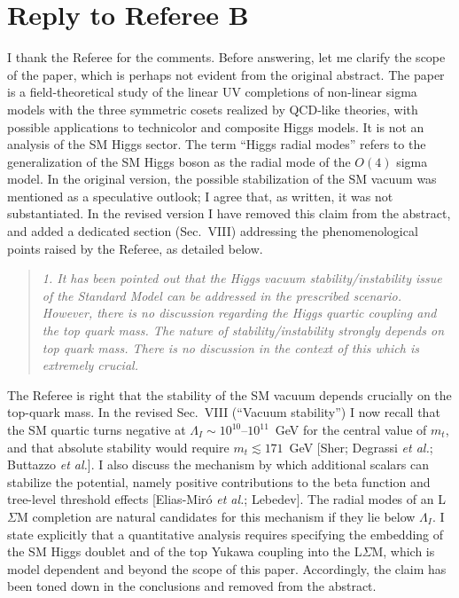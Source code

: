 \documentclass[11pt,a4paper]{article}
\newcommand{\referee}[1]{\begin{quote}\itshape\color{black!70}#1\end{quote}}
\begin{document}
\section*{Reply to Referee B}

I thank the Referee for the comments. Before answering, let me clarify the scope of the paper, which is perhaps not evident from the original abstract. The paper is a field-theoretical study of the linear UV completions of non-linear sigma models with the three symmetric cosets realized by QCD-like theories, with possible applications to technicolor and composite Higgs models. It is not an analysis of the SM Higgs sector. The term ``Higgs radial modes'' refers to the generalization of the SM Higgs boson as the radial mode of the $O(4)$ sigma model. In the original version, the possible stabilization of the SM vacuum was mentioned as a speculative outlook; I agree that, as written, it was not substantiated. In the revised version I have removed this claim from the abstract, and added a dedicated section (Sec.~VIII) addressing the phenomenological points raised by the Referee, as detailed below.

\referee{1. It has been pointed out that the Higgs vacuum stability/instability issue of the Standard Model can be addressed in the prescribed scenario. However, there is no discussion regarding the Higgs quartic coupling and the top quark mass. The nature of stability/instability strongly depends on top quark mass. There is no discussion in the context of this which is extremely crucial.}

The Referee is right that the stability of the SM vacuum depends crucially on the top-quark mass. In the revised Sec.~VIII (``Vacuum stability'') I now recall that the SM quartic turns negative at $\Lambda_I\sim10^{10}$--$10^{11}$~GeV for the central value of $m_t$, and that absolute stability would require $m_t\lesssim171$~GeV [Sher; Degrassi \emph{et al.}; Buttazzo \emph{et al.}]. I also discuss the mechanism by which additional scalars can stabilize the potential, namely positive contributions to the beta function and tree-level threshold effects [Elias-Mir\'o \emph{et al.}; Lebedev]. The radial modes of an L$\Sigma$M completion are natural candidates for this mechanism if they lie below $\Lambda_I$. I state explicitly that a quantitative analysis requires specifying the embedding of the SM Higgs doublet and of the top Yukawa coupling into the L$\Sigma$M, which is model dependent and beyond the scope of this paper. Accordingly, the claim has been toned down in the conclusions and removed from the abstract.
\end{document}
